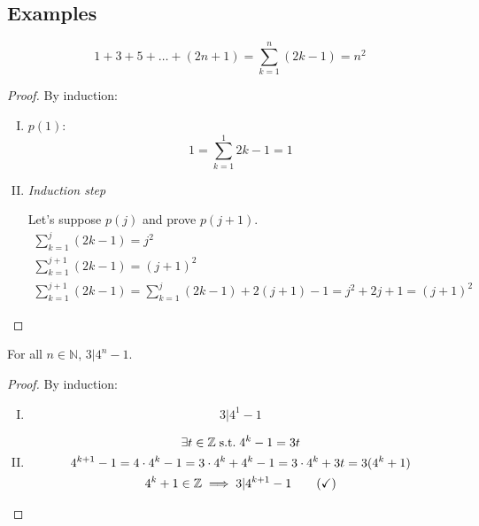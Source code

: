\documentclass[00_complete]{subfiles}
\begin{document}
\subsection{Examples}
\begin{example}
    $$1+3+5+\dots+(2n+1)= \sum_{k=1}^{n}(2k-1)=n^2$$
\begin{proof}
    By induction:
    \begin{enumerate}[I.]
        \item $p(1)$:
        \begin{equation}
        1= \sum_{k=1}^{1}2k-1 =1 \tag{\checkmark}
        \end{equation}
        \item \emph{Induction step}

        Let's suppose $p(j)$ and prove $p(j+1)$.
        \begin{gather*}
            \sum_{k=1}^j(2k-1)=j^2 \\
            \sum_{k=1}^{j+1}(2k-1)=(j+1)^2 \\
            \sum_{k=1}^{j+1}(2k-1) = \sum_{k=1}^j(2k-1)+2(j+1)-1 = j^2+2j+1 =
            (j+1)^2 \tag{\checkmark}
        \end{gather*}
    \end{enumerate}
\end{proof}
\end{example}
\begin{example}
    For all $n \in \mathbb{N}$, $3|4^n-1$.
    \begin{proof}
    By induction:
    \begin{enumerate}[I.]
        \item
            \begin{equation}
                3|4^1-1 \tag{\checkmark}
            \end{equation}
        \item
            \begin{gather*}
                \exists t \in \mathbb{Z} \;\mathrm{s.t.}\; 4^k-1=3t \\
                4^{k+1}-1=4\cdot 4^k-1 = 3\cdot 4^k + 4^k-1=3\cdot
                4^k+3t=3(4^k+1) \\
                4^k+1 \in \mathbb{Z} \implies 3|4^{k+1}-1\tag{\checkmark}
            \end{gather*}
    \end{enumerate}
    \end{proof}
\end{example}
\end{document}
